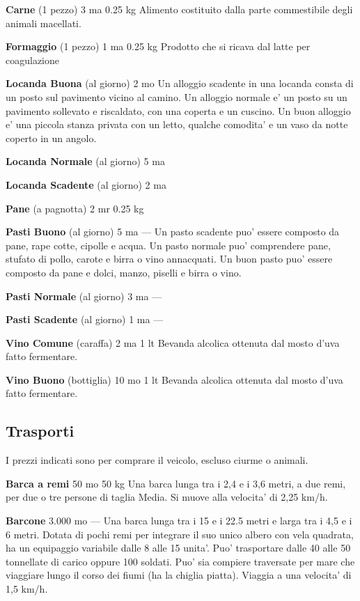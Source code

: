 \documentclass[a4paper,11pt,twoside,openany]{book}
\begin{document}
{\textbf{Carne} (1 pezzo) 3 ma 0.25 kg Alimento costituito dalla parte commestibile degli animali macellati.

\textbf{Formaggio} (1 pezzo) 1 ma 0.25 kg Prodotto che si ricava dal latte per coagulazione

\textbf{Locanda Buona} (al giorno) 2 mo Un alloggio scadente in una locanda consta di un posto sul pavimento vicino al camino. Un alloggio normale e' un posto su un pavimento sollevato e riscaldato, con una coperta e un cuscino. Un buon alloggio e' una piccola stanza privata con un letto, qualche comodita' e un vaso da notte coperto in un angolo.

\textbf{Locanda Normale} (al giorno) 5 ma

\textbf{Locanda Scadente} (al giorno) 2 ma 

\textbf{Pane} (a pagnotta) 2 mr 0.25 kg

\textbf{Pasti Buono} (al giorno) 5 ma --- Un pasto scadente puo' essere composto da pane, rape cotte, cipolle e acqua. Un pasto normale puo' comprendere pane, stufato di pollo, carote e birra o vino annacquati. Un buon pasto puo' essere composto da pane e dolci, manzo, piselli e birra o vino.

\textbf{Pasti Normale} (al giorno) 3 ma ---

\textbf{Pasti Scadente} (al giorno) 1 ma ---

\textbf{Vino Comune} (caraffa) 2 ma 1 lt Bevanda alcolica ottenuta dal mosto d'uva fatto fermentare.

\textbf{Vino Buono} (bottiglia) 10 mo 1 lt Bevanda alcolica ottenuta dal mosto d'uva fatto fermentare.

\pagebreak

\subsection{Trasporti}

\label{trasporti}

I prezzi indicati sono per comprare il veicolo, escluso ciurme o animali.

\textbf{Barca a remi} 50 mo 50 kg Una barca lunga tra i 2,4 e i 3,6 metri, a due remi, per due o tre persone di taglia Media. Si muove alla velocita' di 2,25 km/h.

\textbf{Barcone} 3.000 mo --- Una barca lunga tra i 15 e i 22.5 metri e larga tra i 4,5 e i 6 metri. Dotata di pochi remi per integrare il suo unico albero con vela quadrata, ha un equipaggio variabile dalle 8 alle 15 unita'. Puo' trasportare dalle 40 alle 50 tonnellate di carico oppure 100 soldati. Puo' sia compiere traversate per mare che viaggiare lungo il corso dei fiumi (ha la chiglia piatta). Viaggia a una velocita' di 1,5 km/h.

}
\end{document}
